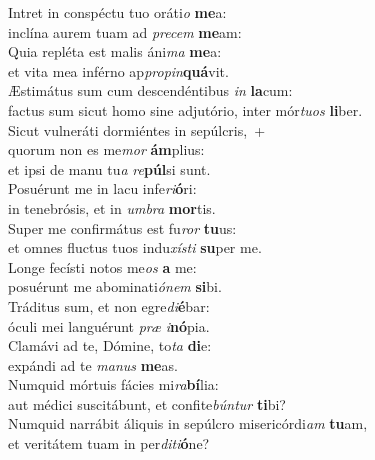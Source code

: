\evenverse Intret in conspéctu tuo oráti\textit{o} \textbf{me}a:~\*\\
\evenverse inclína aurem tuam ad \textit{pre}\textit{cem} \textbf{me}am:\\
\oddverse Quia repléta est malis áni\textit{ma} \textbf{me}a:~\*\\
\oddverse et vita mea inférno ap\textit{pro}\textit{pin}\textbf{quá}vit.\\
\evenverse Æstimátus sum cum descendéntibus \textit{in} \textbf{la}cum:~\*\\
\evenverse factus sum sicut homo sine adjutório, inter mór\textit{tu}\textit{os} \textbf{li}ber.\\
\oddverse Sicut vulneráti dormiéntes in sepúlcris,~+\\
\oddverse  quorum non es me\textit{mor} \textbf{ám}plius:~\*\\
\oddverse et ipsi de manu tu\textit{a} \textit{re}\textbf{púl}si sunt.\\
\evenverse Posuérunt me in lacu infe\textit{ri}\textbf{ó}ri:~\*\\
\evenverse in tenebrósis, et in \textit{um}\textit{bra} \textbf{mor}tis.\\
\oddverse Super me confirmátus est fu\textit{ror} \textbf{tu}us:~\*\\
\oddverse et omnes fluctus tuos indu\textit{xí}\textit{sti} \textbf{su}per me.\\
\evenverse Longe fecísti notos me\textit{os} \textbf{a} me:~\*\\
\evenverse posuérunt me abominati\textit{ó}\textit{nem} \textbf{si}bi.\\
\oddverse Tráditus sum, et non egre\textit{di}\textbf{é}bar:~\*\\
\oddverse óculi mei languérunt \textit{præ} \textit{i}\textbf{nó}pia.\\
\evenverse Clamávi ad te, Dómine, to\textit{ta} \textbf{di}e:~\*\\
\evenverse expándi ad te \textit{ma}\textit{nus} \textbf{me}as.\\
\oddverse Numquid mórtuis fácies mi\textit{ra}\textbf{bí}lia:~\*\\
\oddverse aut médici suscitábunt, et confite\textit{bún}\textit{tur} \textbf{ti}bi?\\
\evenverse Numquid narrábit áliquis in sepúlcro misericórdi\textit{am} \textbf{tu}am,~\*\\
\evenverse et veritátem tuam in per\textit{di}\textit{ti}\textbf{ó}ne?\\
